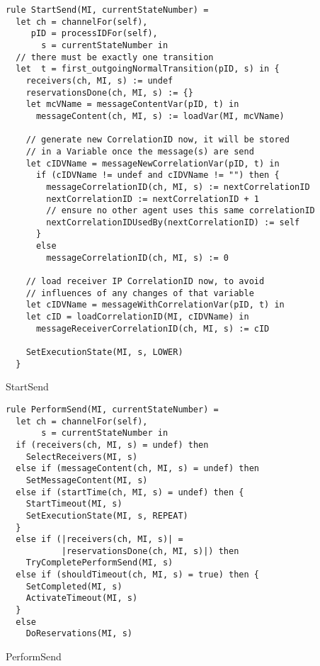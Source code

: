 \begin{listing}[H]
\begin{verbatim}
rule StartSend(MI, currentStateNumber) =
  let ch = channelFor(self),
     pID = processIDFor(self),
       s = currentStateNumber in
  // there must be exactly one transition
  let  t = first_outgoingNormalTransition(pID, s) in {
    receivers(ch, MI, s) := undef
    reservationsDone(ch, MI, s) := {}
    let mcVName = messageContentVar(pID, t) in
      messageContent(ch, MI, s) := loadVar(MI, mcVName)

    // generate new CorrelationID now, it will be stored
    // in a Variable once the message(s) are send
    let cIDVName = messageNewCorrelationVar(pID, t) in
      if (cIDVName != undef and cIDVName != "") then {
        messageCorrelationID(ch, MI, s) := nextCorrelationID
        nextCorrelationID := nextCorrelationID + 1
        // ensure no other agent uses this same correlationID
        nextCorrelationIDUsedBy(nextCorrelationID) := self
      }
      else
        messageCorrelationID(ch, MI, s) := 0

    // load receiver IP CorrelationID now, to avoid
    // influences of any changes of that variable
    let cIDVName = messageWithCorrelationVar(pID, t) in
    let cID = loadCorrelationID(MI, cIDVName) in
      messageReceiverCorrelationID(ch, MI, s) := cID

    SetExecutionState(MI, s, LOWER)
  }
\end{verbatim}
\caption{StartSend}
\label{lst:asm:StartSend}
\end{listing}




\begin{listing}[H]
\begin{verbatim}
rule PerformSend(MI, currentStateNumber) =
  let ch = channelFor(self),
       s = currentStateNumber in
  if (receivers(ch, MI, s) = undef) then
    SelectReceivers(MI, s)
  else if (messageContent(ch, MI, s) = undef) then
    SetMessageContent(MI, s)
  else if (startTime(ch, MI, s) = undef) then {
    StartTimeout(MI, s)
    SetExecutionState(MI, s, REPEAT)
  }
  else if (|receivers(ch, MI, s)| =
           |reservationsDone(ch, MI, s)|) then
    TryCompletePerformSend(MI, s)
  else if (shouldTimeout(ch, MI, s) = true) then {
    SetCompleted(MI, s)
    ActivateTimeout(MI, s)
  }
  else
    DoReservations(MI, s)
\end{verbatim}
\caption{PerformSend}
\label{lst:asm:PerformSend}
\end{listing}




